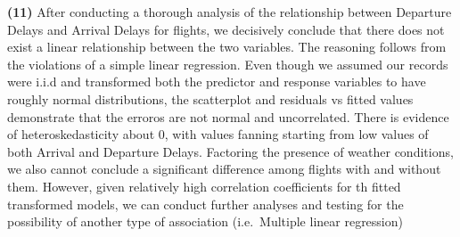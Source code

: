 \documentclass[
  12pt,
]{article}
\begin{document}
\textbf{(11)} After conducting a thorough analysis of the relationship
between Departure Delays and Arrival Delays for flights, we decisively
conclude that there does not exist a linear relationship between the two
variables. The reasoning follows from the violations of a simple linear
regression. Even though we assumed our records were i.i.d and
transformed both the predictor and response variables to have roughly
normal distributions, the scatterplot and residuals vs fitted values
demonstrate that the erroros are not normal and uncorrelated. There is
evidence of heteroskedasticity about 0, with values fanning starting
from low values of both Arrival and Departure Delays. Factoring the
presence of weather conditions, we also cannot conclude a significant
difference among flights with and without them. However, given
relatively high correlation coefficients for th fitted transformed
models, we can conduct further analyses and testing for the possibility
of another type of association (i.e.~Multiple linear regression)
\end{document}
